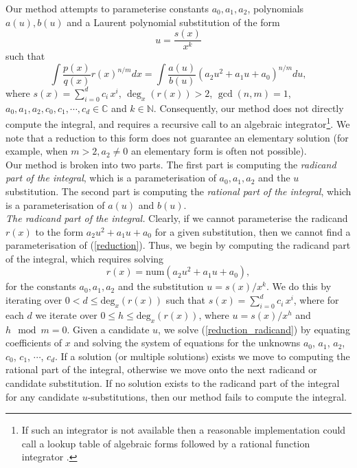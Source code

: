 \documentclass[12pt]{article}
\numberwithin{equation}{section}
\theoremstyle{definition}
\begin{document}
Our method attempts to parameterise constants $a_0, a_1, a_2$, polynomials $a(u), b(u)$ and a 
Laurent polynomial substitution of the form 
\begin{equation*}
u = \frac{s(x)}{x^k}
\end{equation*}
such that
\begin{equation}
\int \frac{p(x)}{q(x)}r(x)^{n/m}dx = \int \frac{a(u)}{b(u)}\left(a_2u^2+a_1u+a_0\right)^{n/m}du,\label{reduction}
\end{equation}
where $s(x) = \sum\limits_{i=0}^{d} c_i\,x^{i}$, $\deg_x(r(x))>2$, $\gcd (n,m)=1$, 
$a_0, a_1,a_2,c_0,c_1,\cdots,c_{d} \in \mathbb{C}$ and $k \in \mathbb{N}$. Consequently, 
our method does not directly compute the integral, and requires a recursive call to an algebraic 
integrator\footnote{If such an integrator is not available then a reasonable implementation 
could call a lookup table of algebraic forms \cite{Prudnikov1986} followed by a rational 
function integrator \cite{Bronstein1997}.}. We note that a reduction to this form
does not guarantee an elementary solution (for example, when $m>2,a_2\ne0$ an elementary form 
is often not possible). \\

Our method is broken into two parts. The first part is computing the \textit{radicand part of 
the integral}, which is a parameterisation of $a_0,a_1,a_2$ and the $u$ 
substitution. The second part is computing the \textit{rational part of the integral}, which is 
a parameterisation of $a(u)$ and $b(u)$.\\

\textit{The radicand part of the integral.} Clearly, if we cannot parameterise the radicand $r(x)$ 
to the form $a_2u^2+a_1u+a_0$ for a given substitution, then we cannot find a 
parameterisation of (\ref{reduction}). Thus, we begin by computing the radicand part 
of the integral, which requires solving 
\begin{equation}
r(x) = \text{num}\left( a_2u^2 + a_1u + a_0 \right), \label{reduction_radicand}
\end{equation}
for the constants $a_0,a_1,a_2$ and the substitution $u = s(x)/x^k$. We do this by iterating over 
$0 < d \leq \text{deg}_x(r(x))$ such that $s(x) = \sum\limits_{i=0}^{d} c_i\,x^{i}$, where for each $d$ we 
iterate over $0 \leq h \leq \text{deg}_x(r(x))$, where $u = s(x)/x^h$ and $ h \mod m = 0$.  
Given a candidate $u$, we solve (\ref{reduction_radicand}) by equating coefficients of $x$ and solving the system of 
equations for the unknowns $a_0$, $a_1$, $a_2$, $c_0$, $c_1$, $\cdots$, $c_d$. If a solution 
(or multiple solutions) exists we move to computing the rational part of the integral, otherwise 
we move onto the next radicand or candidate substitution. If no solution exists to the radicand 
part of the integral for any candidate $u$-substitutions, then our method fails to 
compute the integral.\\
\end{document}
